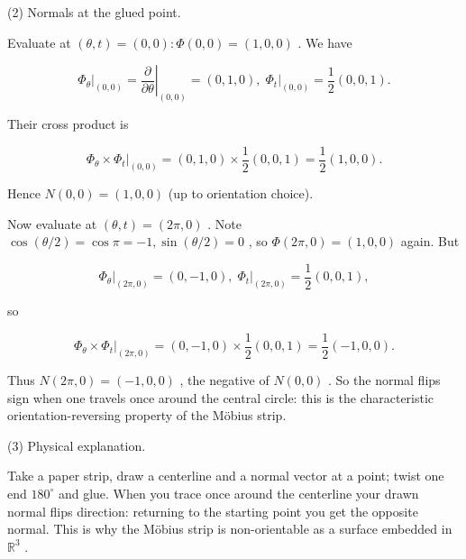 \documentclass[10pt]{article}
\begin{document}
(2) Normals at the glued point.

Evaluate at \(\left( {\theta ,t}\right)  = \left( {0,0}\right)  : \Phi \left( {0,0}\right)  = \left( {1,0,0}\right)\) . We have

\[
{\left. {\Phi }_{\theta }\right| }_{\left( 0,0\right) } = {\left. \frac{\partial }{\partial \theta }\right| }_{\left( 0,0\right) } = \left( {0,1,0}\right) ,{\left. \;{\Phi }_{t}\right| }_{\left( 0,0\right) } = \frac{1}{2}\left( {0,0,1}\right) .
\]

Their cross product is

\[
{\left. {\Phi }_{\theta } \times  {\Phi }_{t}\right| }_{\left( 0,0\right) } = \left( {0,1,0}\right)  \times  \frac{1}{2}\left( {0,0,1}\right)  = \frac{1}{2}\left( {1,0,0}\right) .
\]

Hence \(N\left( {0,0}\right)  = \left( {1,0,0}\right)\) (up to orientation choice).

Now evaluate at \(\left( {\theta ,t}\right)  = \left( {{2\pi },0}\right)\) . Note \(\cos \left( {\theta /2}\right)  = \cos \pi  =  - 1,\sin \left( {\theta /2}\right)  = 0\) , so \(\Phi \left( {{2\pi },0}\right)  = \left( {1,0,0}\right)\) again. But

\[
{\left. {\Phi }_{\theta }\right| }_{\left( 2\pi ,0\right) } = \left( {0, - 1,0}\right) ,{\left. \;{\Phi }_{t}\right| }_{\left( 2\pi ,0\right) } = \frac{1}{2}\left( {0,0,1}\right) ,
\]

so

\[
{\left. {\Phi }_{\theta } \times  {\Phi }_{t}\right| }_{\left( 2\pi ,0\right) } = \left( {0, - 1,0}\right)  \times  \frac{1}{2}\left( {0,0,1}\right)  = \frac{1}{2}\left( {-1,0,0}\right) .
\]

Thus \(N\left( {{2\pi },0}\right)  = \left( {-1,0,0}\right)\) , the negative of \(N\left( {0,0}\right)\) . So the normal flips sign when one travels once around the central circle: this is the characteristic orientation-reversing property of the Möbius strip.

(3) Physical explanation.

Take a paper strip, draw a centerline and a normal vector at a point; twist one end \({180}^{ \circ  }\) and glue. When you trace once around the centerline your drawn normal flips direction: returning to the starting point you get the opposite normal. This is why the Möbius strip is non-orientable as a surface embedded in \({\mathbb{R}}^{3}\) .
\end{document}
